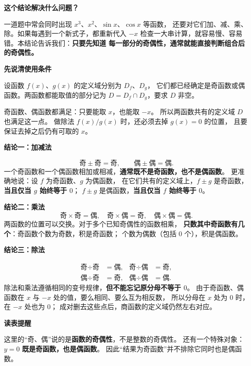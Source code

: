 \begin{statementbox}


\textbf{\textcolor{CStatement}{这个结论解决什么问题？}}

一道题中常会同时出现 $x^3$、$x^2$、$\sin x$、$\cos x$ 等函数，
还要对它们加、减、乘、除。如果每遇到一个新式子，都重新代入 $-x$
检查一大串计算，就容易慢、容易错。本结论告诉我们：\textbf{只要先知道
每一部分的奇偶性，通常就能直接判断组合后的奇偶性。}

\medskip
\textbf{\textcolor{CStatement}{先说清使用条件}}

设函数 $f(x)$、$g(x)$ 的定义域分别为 $D_f$、$D_g$，
它们都已经确定是奇函数或偶函数。两函数都能取值的部分记为
$D=D_f\cap D_g$，要求 $D$ 非空。

奇函数、偶函数都满足：只要能取 $x$，也能取 $-x$。
所以两函数共有的定义域 $D$ 也满足这一点。
做除法 $f(x)/g(x)$ 时，还必须去掉 $g(x)=0$ 的位置，
且要保证去掉之后仍有可取的 $x$。

\medskip
\end{statementbox}\clearpage\begin{statementbox}\textbf{\textcolor{CStatement}{结论一：加减法}}

 
\[
\boxed{\text{奇}\pm\text{奇}=\text{奇},\qquad
\text{偶}\pm\text{偶}=\text{偶}.}
\]
一个奇函数和一个偶函数相加或相减，\textbf{通常既不是奇函数，也不是偶函数}。
更准确地说：设 $f$ 为奇函数、$g$ 为偶函数，
在它们共有的定义域上，$f\pm g$ 是奇函数，\textbf{当且仅当 $g$ 始终等于 $0$}；
$f\pm g$ 是偶函数，\textbf{当且仅当 $f$ 始终等于 $0$}。

\medskip
\textbf{\textcolor{CStatement}{结论二：乘法}}
\[
\boxed{\text{奇}\times\text{奇}=\text{偶},\quad
\text{奇}\times\text{偶}=\text{奇},\quad
\text{偶}\times\text{偶}=\text{偶}.}
\]
两函数的位置可以交换。对于多个已知奇偶性的函数相乘，
\textbf{只数其中奇函数有几个}：奇函数个数为奇数，积是奇函数；
个数为偶数（包括 $0$ 个），积是偶函数。

\medskip
\end{statementbox}\clearpage\begin{statementbox}\textbf{\textcolor{CStatement}{结论三：除法}}


\[
\boxed{\begin{aligned}
\text{奇}\div\text{奇}&=\text{偶}, &\text{奇}\div\text{偶}&=\text{奇},\\
\text{偶}\div\text{奇}&=\text{奇}, &\text{偶}\div\text{偶}&=\text{偶}.
\end{aligned}}
\]
除法和乘法遵循相同的变号规律，\textbf{但不能忘记原分母不等于 $0$}。
由于奇函数、偶函数在 $x$ 与 $-x$ 处的值，要么相同、要么互为相反数，
所以分母在 $x$ 处为 $0$ 时，在 $-x$ 处也为 $0$；
成对删去这些点后，商函数的定义域仍然左右对应。

\medskip
\textbf{\textcolor{CStatement}{读表提醒}}

这里的“奇、偶”说的是\textbf{函数的奇偶性}，不是整数的奇偶性。
还有一个特殊对象：$y=0$ \textbf{既是奇函数，也是偶函数}。
因此“结果为奇函数”并不排除它同时也是偶函数。
\end{statementbox}
